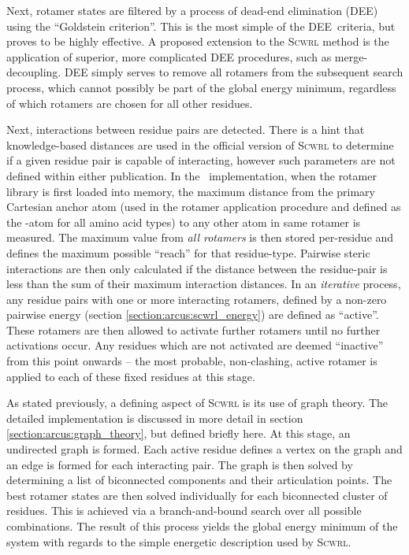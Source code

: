 Next, rotamer states are filtered by a process of dead-end elimination (DEE) using the ``Goldstein criterion''. This is the most simple of the DEE\ criteria, but proves to be highly effective. A proposed extension to the \textsc{Scwrl} method is the application of superior, more complicated DEE procedures, such as merge-decoupling\cite{METHOD:MERGE_DECOUPLING_DEE}.
DEE simply serves to remove all rotamers from the subsequent search process, which cannot possibly be part of the global energy minimum, regardless of which rotamers are chosen for all other residues.

Next, interactions between residue pairs are detected.
There is a hint that knowledge-based distances are used in the official version of \textsc{Scwrl} to determine if a given residue pair is capable of interacting, however such parameters are not defined within either publication. In the \pd\ implementation, when the rotamer library is first loaded into memory, the maximum distance from the primary Cartesian anchor atom (used in the rotamer application procedure and defined as the \ca-atom for all amino acid types) to any other atom in same rotamer is measured. The maximum value from \emph{all rotamers} is then stored per-residue and defines the maximum possible ``reach'' for that residue-type. Pairwise steric interactions are then only calculated if the distance between the residue-pair is less than the sum of their maximum interaction distances. In an \emph{iterative} process, any residue pairs with one or more interacting rotamers, defined by a non-zero pairwise energy (section \ref{section:arcus:scwrl_energy}) are defined as ``active''. These rotamers are then allowed to activate further rotamers until no further activations occur. Any residues which are not activated are deemed ``inactive'' from this point onwards -- the most probable, non-clashing, active  rotamer is applied to each of these fixed residues at this stage.

As stated previously, a defining aspect of \textsc{Scwrl} is its use of graph theory. The detailed implementation is discussed in more detail in section \ref{section:arcus:graph_theory}, but defined briefly  here. At this stage, an undirected graph is formed. Each active residue defines a vertex on the graph and an edge is formed for each interacting pair. The graph is then solved by determining a list of  biconnected components
and their articulation points. The best rotamer states are then solved individually for each biconnected cluster of residues. This is achieved  via a branch-and-bound search over all possible combinations. The result of this process yields the global energy minimum of the system with regards to the simple energetic description used by \textsc{Scwrl}.

